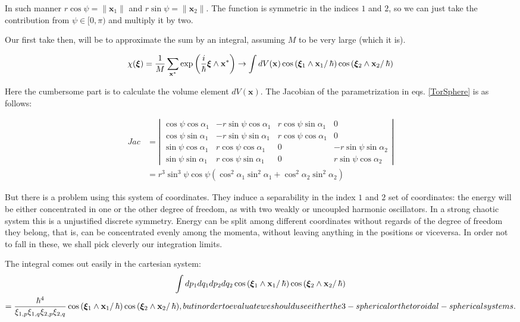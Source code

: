 \documentclass[a4paper,12pt]{article}
\newcommand{\ihb}{\frac{i}{\hbar}}
\newcommand{\xfase}{\mathbf{x}}
\newcommand{\xifase}{ {\boldsymbol{\xi}} }
\begin{document}
In such manner $r\cos\psi= \|\xfase_1\|$ and $r\sin\psi= \|\xfase_2\|$.
The function is symmetric in the indices $1$ and $2$, so we can just
take the contribution from $\psi \in [0, \pi)$ and multiply it by two.

Our first take then, will be to approximate the sum  by an integral,
assuming $M$ to be very large (which it is).

\begin{equation}
\chi(\xifase)=\frac{1}{M}\sum_{\xfase^*} \exp \left( \ihb \xifase\wedge\xfase^* \right)
\rightarrow\int dV(\xfase) \cos \left( \xifase_1\wedge\xfase_1 \right/\hbar)
\cos \left( \xifase_2\wedge\xfase_2 \right/\hbar)
\end{equation}

Here the cumbersome part is to calculate the volume element $dV(\xfase)$. 
The Jacobian of the parametrization in eqs. \ref{TorSphere} is
as follows:

\begin{equation}
\begin{split}
Jac&=
\left|
\begin{array}{cccc}
\cos\psi\cos\alpha_1 & -r\sin\psi\cos\alpha_1 & r\cos\psi\sin\alpha_1 & 0 \\
\cos\psi\sin\alpha_1 & -r\sin\psi\sin\alpha_1 & r\cos\psi\cos\alpha_1 & 0 \\
\sin\psi\cos\alpha_1 & r\cos\psi\cos\alpha_1 & 0 & -r\sin\psi\sin\alpha_2 \\
\sin\psi\sin\alpha_1 & r\cos\psi\sin\alpha_1 & 0 & r\sin\psi\cos\alpha_2 
\end{array}
\right|\\
&=r^3 \sin^3\psi\cos\psi
(\cos^2\alpha_1\sin^2\alpha_1 +\cos^2\alpha_2\sin^2\alpha_2)
\end{split}  
\end{equation}


But there is a problem using this system of coordinates.
They induce a separability in the index $1$ and $2$ set
of coordinates: the energy will be either concentrated
in one or the other degree of freedom, as with two 
weakly or uncoupled harmonic oscillators. In a strong
chaotic system this is a unjustified discrete symmetry. 
Energy can  be split among different coordinates
without regards of the degree of freedom they belong, that
is, can be concentrated evenly among the momenta, without
leaving anything in the positions or viceversa.
In order not to fall in these, we shall pick cleverly 
our integration limits. 



The integral comes out easily in the cartesian system:
\begin{multline}
\int dp_1 dq_1 dp_2 dq_2 \cos \left( \xifase_1\wedge\xfase_1 \right/\hbar)
\cos \left( \xifase_2\wedge\xfase_2 \right/\hbar)\\
=\frac{\hbar^4}{\xi_{1,p}\xi_{1,q}\xi_{2,p}\xi_{2,q}}
\cos \left( \xifase_1\wedge\xfase_1 \right/\hbar)
\cos \left( \xifase_2\wedge\xfase_2 \right/\hbar),
but in order to evaluate we should use either the 
3-spherical or the toroidal-spherical systems.


\end{multline}


\end{document}
